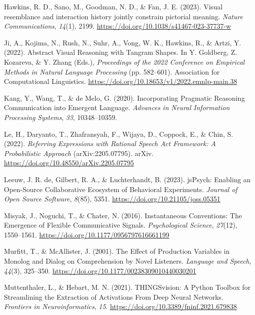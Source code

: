 \documentclass[10pt, letterpaper]{article}
\begin{document}
\begin{CSLReferences}{1}{0}
Hawkins, R. D., Sano, M., Goodman, N. D., \& Fan, J. E. (2023). Visual
resemblance and interaction history jointly constrain pictorial meaning.
\emph{Nature Communications}, \emph{14}(1), 2199.
\url{https://doi.org/10.1038/s41467-023-37737-w}

Ji, A., Kojima, N., Rush, N., Suhr, A., Vong, W. K., Hawkins, R., \&
Artzi, Y. (2022). Abstract {Visual Reasoning} with {Tangram Shapes}. In
Y. Goldberg, Z. Kozareva, \& Y. Zhang (Eds.), \emph{Proceedings of the
2022 {Conference} on {Empirical Methods} in {Natural Language
Processing}} (pp. 582--601). Association for Computational Linguistics.
\url{https://doi.org/10.18653/v1/2022.emnlp-main.38}

Kang, Y., Wang, T., \& de Melo, G. (2020). Incorporating {Pragmatic
Reasoning Communication} into {Emergent Language}. \emph{Advances in
{Neural Information Processing Systems}}, \emph{33}, 10348--10359.

Le, H., Daryanto, T., Zhafransyah, F., Wijaya, D., Coppock, E., \& Chin,
S. (2022). \emph{Referring {Expressions} with {Rational Speech Act
Framework}: {A Probabilistic Approach}} (arXiv:2205.07795). arXiv.
\url{https://doi.org/10.48550/arXiv.2205.07795}

Leeuw, J. R. de, Gilbert, R. A., \& Luchterhandt, B. (2023). {jsPsych}:
{Enabling} an {Open-Source Collaborative Ecosystem} of {Behavioral
Experiments}. \emph{Journal of Open Source Software}, \emph{8}(85),
5351. \url{https://doi.org/10.21105/joss.05351}

Misyak, J., Noguchi, T., \& Chater, N. (2016). Instantaneous
{Conventions}: {The Emergence} of {Flexible Communicative Signals}.
\emph{Psychological Science}, \emph{27}(12), 1550--1561.
\url{https://doi.org/10.1177/0956797616661199}

Murfitt, T., \& McAllister, J. (2001). The {Effect} of {Production
Variables} in {Monolog} and {Dialog} on {Comprehension} by {Novel
Listeners}. \emph{Language and Speech}, \emph{44}(3), 325--350.
\url{https://doi.org/10.1177/00238309010440030201}

Muttenthaler, L., \& Hebart, M. N. (2021). {THINGSvision}: {A Python
Toolbox} for {Streamlining} the {Extraction} of {Activations From Deep
Neural Networks}. \emph{Frontiers in Neuroinformatics}, \emph{15}.
\url{https://doi.org/10.3389/fninf.2021.679838}


\end{CSLReferences}
\end{document}
